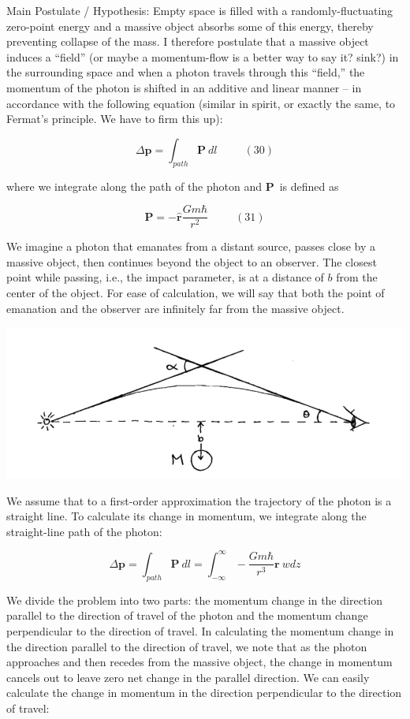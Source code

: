 \documentclass {article}
\renewcommand\vec{\mathbf}
\let\OldHat\hat
\renewcommand{\hat}[1]{\OldHat{\mathbf{#1}}}
\begin{document}
Main Postulate / Hypothesis: Empty space is filled with a randomly-fluctuating zero-point energy and a massive object absorbs some of this energy, thereby preventing collapse of the mass. I therefore postulate that a massive object induces a “field” (or maybe a momentum-flow is a better way to say it? sink?) in the surrounding space and when a photon travels through this “field,” the momentum of the photon is shifted in an additive and linear manner – in accordance with the following equation (similar in spirit, or exactly the same, to Fermat's principle. We have to firm this up): 

$$\Delta \vec p = \int_{path} \vec P ~ dl ~~~~~~~~~~~ (30)$$

where we integrate along the path of the photon and $\vec P$ is defined as

$$\vec P = - \hat r \frac {Gm\hbar}{r^2} ~~~~~~~~~~~ (31)$$

We imagine a photon that emanates from a distant source, passes close by a massive object, then continues beyond the object to an observer. The closest point while passing, i.e., the impact parameter, is at a distance of $b$ from the center of the object. For ease of calculation, we will say that both the point of emanation and the observer are infinitely far from the massive object.

\begin{center}
	\includegraphics[scale=0.4]{light-bending.png}
\end{center}


We assume that to a first-order approximation the trajectory of the photon is a straight line. To calculate its change in momentum, we integrate along the straight-line path of the photon:

$$\Delta \vec p = \int_{path} \vec P ~ dl = \int_{-\infty}^{\infty} - \frac {Gm\hbar}{r^3} \vec r ~ wdz $$

We divide the problem into two parts: the momentum change in the direction parallel to the direction of travel of the photon and the momentum change perpendicular to the direction of travel. In calculating the momentum change in the direction parallel to the direction of travel, we note that as the photon approaches and then recedes from the massive object, the change in momentum cancels out to leave zero net change in the parallel direction. We can easily calculate the change in momentum in the direction perpendicular to the direction of travel:
\end{document}
